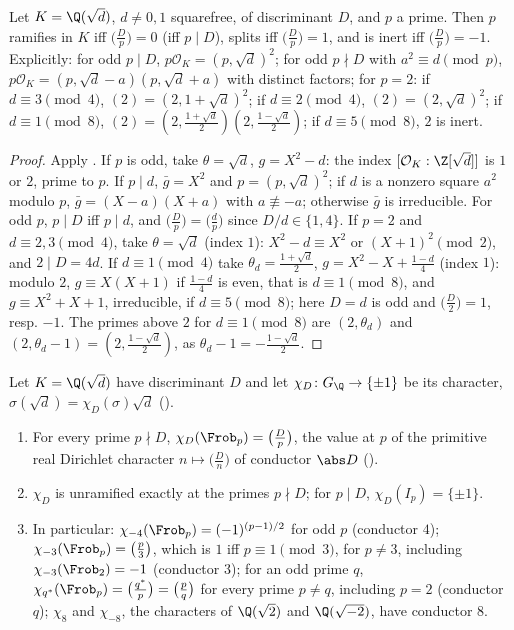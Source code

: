 \begin{theorem}\label{thm:ant:quadsplit}
Let $K=\Q(\sqrt d)$, $d\ne0,1$ squarefree, of discriminant $D$, and $p$ a prime. Then $p$ ramifies in $K$ iff $\bigl(\frac Dp\bigr)=0$ (iff $p\mid D$), splits
iff $\bigl(\frac Dp\bigr)=1$, and is inert iff $\bigl(\frac Dp\bigr)=-1$. Explicitly: for odd $p\mid D$, $p\mathcal O_K=(p,\sqrt d)^2$; for odd $p\nmid D$ with
$a^2\equiv d\pmod p$, $p\mathcal O_K=(p,\sqrt d-a)(p,\sqrt d+a)$ with distinct factors; for $p=2$: if $d\equiv3\pmod4$, $(2)=(2,1+\sqrt d)^2$; if
$d\equiv2\pmod4$, $(2)=(2,\sqrt d)^2$; if $d\equiv1\pmod8$, $(2)=(2,\frac{1+\sqrt d}2)(2,\frac{1-\sqrt d}2)$; if $d\equiv5\pmod8$, $2$ is inert.
\end{theorem}

\begin{proof}
Apply . If $p$ is odd, take $\theta=\sqrt d$, $g=X^2-d$: the index $[\mathcal O_K:\Z[\sqrt d]]$ is $1$ or $2$, prime to $p$. If
$p\mid d$, $\bar g=X^2$ and $p=(p,\sqrt d)^2$; if $d$ is a nonzero square $a^2$ modulo $p$, $\bar g=(X-a)(X+a)$ with $a\not\equiv-a$; otherwise $\bar g$ is
irreducible. For odd $p$, $p\mid D$ iff $p\mid d$, and $\bigl(\frac Dp\bigr)=\bigl(\frac dp\bigr)$ since $D/d\in\{1,4\}$. If $p=2$ and $d\equiv2,3\pmod4$, take
$\theta=\sqrt d$ (index $1$): $X^2-d\equiv X^2$ or $(X+1)^2\pmod 2$, and $2\mid D=4d$. If $d\equiv1\pmod4$ take $\theta_d=\frac{1+\sqrt d}2$, $g=X^2-X+\frac{1-d}4$
(index $1$): modulo $2$, $g\equiv X(X+1)$ if $\frac{1-d}4$ is even, that is $d\equiv1\pmod8$, and $g\equiv X^2+X+1$, irreducible, if $d\equiv5\pmod8$; here
$D=d$ is odd and $\bigl(\frac D2\bigr)=1$, resp. $-1$. The primes above $2$ for $d\equiv1\pmod8$ are $(2,\theta_d)$ and $(2,\theta_d-1)=(2,\frac{1-\sqrt d}2)$, as $\theta_d-1=-\frac{1-\sqrt d}2$.
\end{proof}

\begin{proposition}\label{prop:ant:quadchar}
Let $K=\Q(\sqrt d)$ have discriminant $D$ and let $\chi_D\colon G_\Q\to\{\pm1\}$ be its character, $\sigma(\sqrt d)=\chi_D(\sigma)\sqrt d$ ().
\begin{enumerate}[label=(\roman*)]
\item For every prime $p\nmid D$, $\chi_D(\Frob_p)=\bigl(\frac Dp\bigr)$, the value at $p$ of the primitive real Dirichlet character $n\mapsto\bigl(\frac Dn\bigr)$ of
conductor $\abs D$ ().
\item $\chi_D$ is unramified exactly at the primes $p\nmid D$; for $p\mid D$, $\chi_D(I_p)=\{\pm1\}$.
\item In particular: $\chi_{-4}(\Frob_p)=(-1)^{(p-1)/2}$ for odd $p$ (conductor $4$); $\chi_{-3}(\Frob_p)=\bigl(\frac p3\bigr)$, which is $1$ iff $p\equiv1\pmod3$, for
$p\ne3$, including $\chi_{-3}(\Frob_2)=-1$ (conductor $3$); for an odd prime $q$, $\chi_{q^*}(\Frob_p)=\bigl(\frac{q^*}p\bigr)=\bigl(\frac pq\bigr)$ for every prime
$p\ne q$, including $p=2$ (conductor $q$); $\chi_8$ and $\chi_{-8}$, the characters of $\Q(\sqrt2)$ and $\Q(\sqrt{-2})$, have conductor $8$.
\end{enumerate}
\end{proposition}

